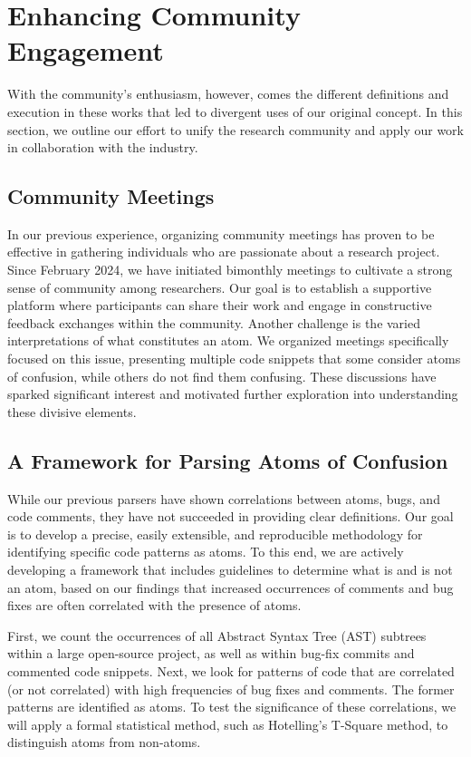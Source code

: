 \documentclass[conference]{IEEEtran}
\begin{document}
\section{Enhancing Community Engagement}

With the community's enthusiasm, however, comes the different definitions and execution in these works that led to divergent uses of our original concept. In this section, we outline our effort to unify the research community and apply our work in collaboration with the industry.

\subsection{Community Meetings}

In our previous experience, organizing community meetings has 
proven to be effective in gathering individuals who are 
passionate about a research project. Since February 2024, we 
have initiated bimonthly meetings to cultivate a strong sense 
of community among researchers. Our goal is to establish a 
supportive platform where participants can share their work 
and engage in constructive feedback exchanges within the 
community.
Another challenge is the varied interpretations of what 
constitutes an atom. We organized meetings specifically 
focused on this issue, presenting multiple code snippets that 
some consider atoms of confusion, while others do not find 
them confusing. These discussions have sparked significant 
interest and motivated further exploration into understanding 
these divisive elements.

\subsection{A Framework for Parsing Atoms of Confusion}

While our previous parsers \cite{gopstein2018prevalence} 
have shown correlations between atoms, bugs, and 
code comments, they have not succeeded in providing clear 
definitions. Our goal is to develop a precise, easily 
extensible, and reproducible methodology for identifying
specific code patterns as atoms. To this end, we are actively 
developing a framework that includes guidelines 
to determine what is and is not an atom, based on our findings that increased occurrences of comments and bug fixes are often 
correlated with the presence of atoms. 

First, we count the occurrences of all Abstract Syntax Tree 
(AST) subtrees within a large open-source project, as well as 
within bug-fix commits and commented code snippets. Next, we 
look for patterns of code that are correlated (or not 
correlated) with high frequencies of bug fixes and comments. 
The former patterns are identified as atoms. To test the 
significance of these correlations, we will apply a formal 
statistical method, such as Hotelling’s T-Square method, to 
distinguish atoms from non-atoms.
\end{document}
